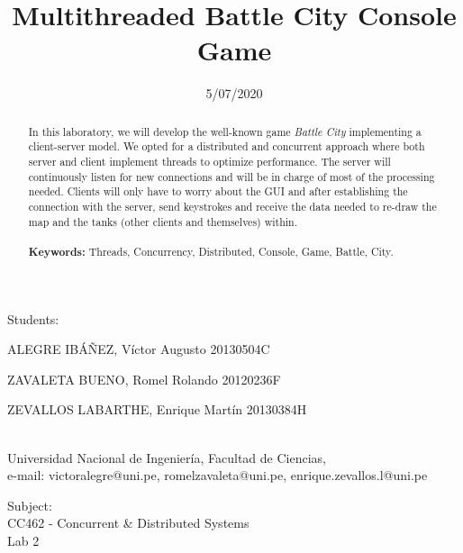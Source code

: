 \documentclass[10pt,a4paper]{article}
\theoremstyle{definition}
\begin{document}
	
\title{Multithreaded Battle City Console Game}
\date{5/07/2020}
\maketitle

\begin{center}
	Students:\\
	\vspace{5pt}
	{\large ALEGRE IBÁÑEZ, Víctor Augusto 20130504C

ZAVALETA BUENO, Romel Rolando 20120236F

ZEVALLOS LABARTHE, Enrique Martín 20130384H}\\
	Universidad Nacional de Ingenier\'ia, Facultad de Ciencias,\\
	e-mail: victoralegre@uni.pe, romelzavaleta@uni.pe, enrique.zevallos.l@uni.pe
	
\end{center}
\vspace{5pt}
\begin{center}
	Subject:\\
	\vspace{5pt}
	{\large CC462 - Concurrent \& Distributed Systems
}\\
	{\large Lab 2}\\
	

	
\end{center}
\vspace{20pt}
\begin{abstract}
{\small
\hspace*{0.5cm}
	In this laboratory, we will develop the well-known game \textit{Battle City} implementing a client-server model. We opted for a distributed and concurrent approach where both server and client implement threads to optimize performance. The server will continuously listen for new connections and will be in charge of most of the processing needed. Clients will only have to worry about the GUI and after establishing the connection with the server, send keystrokes and receive the data needed to re-draw the map and the tanks (other clients and themselves) within.\\\\
\textbf{Keywords:} Threads, Concurrency, Distributed, Console, Game, Battle, City.
}
\end{abstract}




\tableofcontents
\end{document}
